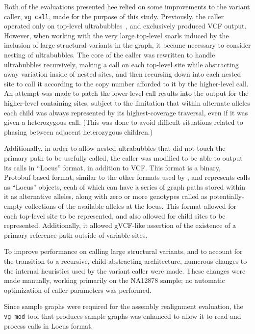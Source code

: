 Both of the evaluations presented hee relied on some improvements to the \vg variant caller, \texttt{vg call}, made for the purpose of this study. Previously, the caller operated only on top-level ultrabubbles~\cite{paten2017superbubbles}, and exclusively produced VCF output. However, when working with the very large top-level snarls induced by the inclusion of large structural variants in the graph, it became necessary to consider nesting of ultrabubbles. The core of the caller was rewritten to handle ultrabubbles recursively, making a call on each top-level site while abstracting away variation inside of nested sites, and then recursing down into each nested site to call it according to the copy number afforded to it by the higher-level call. An attempt was made to patch the lower-level call results into the output for the higher-level containing sites, subject to the limitation that within alternate alleles each child was always represented by its highest-coverage traversal, even if it was given a heterozygous call. (This was done to avoid difficult situations related to phasing between adjacent heterozygous children.)

Additionally, in order to allow nested ultrabubbles that did not touch the primary path to be usefully called, the caller was modified to be able to output its calls in ``Locus'' format, in addition to VCF. This format is a binary, Protobuf-based format, similar to the other formats used by \vg, and represents calls as ``Locus'' objects, ecah of which can have a series of graph paths stored within it as alternative alleles, along with zero or more genotypes called as potentially-empty collections of the available alleles at the locus. This format allowed for each top-level site to be represented, and also allowed for child sites to be represented. Additionally, it allowed gVCF-like assertion of the existence of a primary reference path outside of variable sites.

To improve performance on calling large structural variants, and to account for the transition to a recursive, child-abstracting architecture, numerous changes to the internal heuristics used by the variant caller were made. These changes were made manually, working primarily on the NA12878 sample; no automatic optimization of caller parameters was performed.

Since sample graphs were required for the assembly realignment evaluation, the \texttt{vg mod} tool that produces sample graphs was enhanced to allow it to read and process calls in Locus format.

